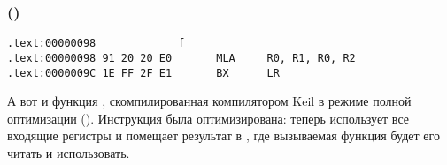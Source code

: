 ﻿\subsubsection{\OptimizingKeilVI (\ARMMode)}

\begin{lstlisting}[label=ARM_leaf_example1,style=customasmARM]
.text:00000098             f
.text:00000098 91 20 20 E0       MLA     R0, R1, R0, R2
.text:0000009C 1E FF 2F E1       BX      LR
\end{lstlisting}

А вот и функция \ttf, скомпилированная компилятором Keil в режиме полной оптимизации (\Othree).
Инструкция \MOV была оптимизирована: теперь  использует все входящие регистры 
и помещает результат в , где вызываемая функция будет его читать и использовать.

